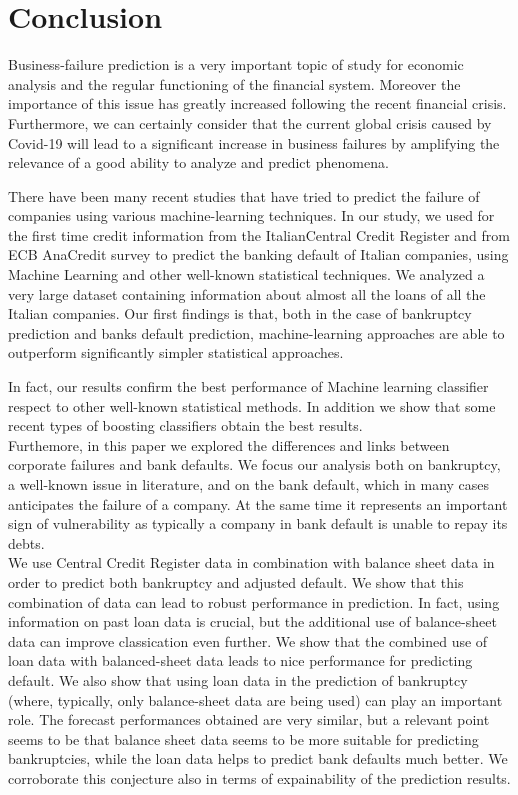 \section{Conclusion}
\label{sec:conclusion}

Business-failure prediction is a very important topic of study for economic analysis and the regular functioning of the financial system. Moreover the importance of this issue has greatly increased following the recent financial crisis. 
Furthermore, we can certainly consider that the current global crisis caused by Covid-19 will lead to a significant increase in business failures by amplifying the relevance of a good ability to analyze and predict phenomena.

There have been many recent studies that have tried to predict the failure of companies using various machine-learning techniques.
In our study, we used for the first time credit information from the ItalianCentral Credit Register and from ECB AnaCredit survey to predict the banking default of Italian companies, using Machine Learning and other well-known statistical techniques.
We analyzed a very large dataset containing information about almost all the loans of all the Italian companies. Our first findings is that, both in the case of bankruptcy prediction and banks default prediction, machine-learning approaches are able to outperform significantly simpler statistical approaches.


In fact, our results confirm the best performance of Machine learning classifier respect to other well-known statistical methods. In addition we show that some recent types of boosting classifiers obtain the best results. 
 \\
 Furthemore, in this paper we explored the differences and links between corporate failures and bank defaults. We focus our analysis both on bankruptcy, a well-known issue in literature, and on the bank default, which in many cases anticipates the failure of a company. At the same time it represents an important sign of vulnerability as typically a company in bank default is unable to repay its debts.
 \\
 We use Central Credit Register data in combination with balance sheet data in order to predict both bankruptcy and adjusted default. We show that this combination of data can lead to robust performance in prediction. 
 In fact, using information on past loan data is crucial, but the additional use of balance-sheet data can improve classication even further. We show that the combined use of loan data with balanced-sheet data leads to nice performance for predicting default. We also show that using loan data in the prediction of bankruptcy (where, typically, only balance-sheet data are being used) can play an important role.
 The forecast performances obtained are very similar, but a relevant point seems to be that balance sheet data seems to be more suitable for predicting bankruptcies, while the loan data helps to predict bank defaults much better. We corroborate this conjecture also in terms of expainability of the prediction results.
 
